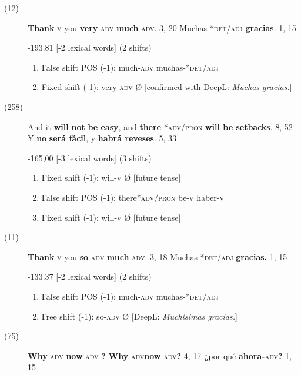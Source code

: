 \documentclass[output=paper]{langsci/langscibook}
\begin{document}
\begin{description}
  \item[(12)] \textbf{Thank}\textsc{-v} you \textbf{very}\textsc{-adv} \textbf{much}\textsc{-adv}. 3, 20 \rightarrow Muchas-\textsc{*det\slash adj} \textbf{gracias}. 1, 15

    -193.81 [-2 lexical words] (2 shifts)

    \begin{enumerate}
      \item False shift POS (-1): much-\textsc{adv} \rightarrow muchas-\textsc{*det\slash adj}
      \item Fixed shift (-1): very\textsc{-adv} \rightarrow Ø [confirmed with DeepL: \textit{Muchas gracias.}]
    \end{enumerate}

  \item[(258)] And it \textbf{will} \textbf{not} \textbf{be easy}, and \textbf{there}\textsc{-*adv/pron} \textbf{will be setbacks}. 8, 52 \rightarrow Y \textbf{no} \textbf{será fácil}, y \textbf{habrá reveses}. 5, 33 

    -165,00 [-3 lexical words] (3 shifts)

    \begin{enumerate}
      \item Fixed shift (-1): will-\textsc{v} \rightarrow Ø [future tense]
      \item False shift POS (-1): there\textsc{*adv/pron} be-\textsc{v} \rightarrow haber-\textsc{v}
      \item Fixed\textbf{ }shift\textbf{ }(-1): will-\textsc{v} \rightarrow Ø [future tense]
    \end{enumerate}

  \item[(11)] \textbf{Thank}\textsc{-v} you \textbf{so}-\textsc{adv} \textbf{much}-\textsc{adv}. 3, 18 \rightarrow Muchas-*\textsc{det/adj} \textbf{gracias.} 1, 15
    
    -133.37 [-2 lexical words] (2 shifts)

    \begin{enumerate}
      \item False shift POS (-1): much-\textsc{adv} \rightarrow muchas-*\textsc{det/adj}
      \item Free shift (-1): so-\textsc{adv} \rightarrow Ø [DeepL: \textit{Muchísimas gracias.}]
    \end{enumerate}

  \item[(75)] \textbf{Why}-\textsc{adv} \textbf{now}-\textsc{adv} \textbf{?} \textbf{Why}-\textsc{adv}\textbf{now}-\textsc{adv}\textbf{?} 4, 17 \rightarrow \textbf{¿}por qué \textbf{ahora-}\textsc{adv}\textbf{?} 1, 15


\end{description}
\end{document}
